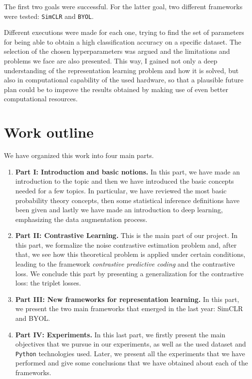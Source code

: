 The first two goals were successful. For the latter goal, two different frameworks were tested: \lstinline{SimCLR} and \lstinline{BYOL}. 

Different executions were made for each one, trying to find the set of parameters for being able to obtain a high classification accuracy on a specific dataset. The selection of the chosen hyperparameters was argued and the limitations and problems we face are also presented. This way, I gained not only a deep understanding of the representation learning problem and how it is solved, but also in computational capability of the used hardware, so that a plausible future plan could be to improve the results obtained by making use of even better computational resources.

\section*{Work outline}

We have organized this work into four main parts.

\begin{enumerate}
\item \textbf{Part I: Introduction and basic notions.} In this part, we have made an introduction to the topic and then we have introduced the basic concepts needed for a few topics. In particular, we have reviewed the most basic probability theory concepts, then some statistical inference definitions have been given and lastly we have made an introduction to deep learning, emphasizing the data augmentation process.
\item \textbf{Part II: Contrastive Learning.} This is the main part of our project. In this part, we formalize the noise contrastive estimation problem and, after that, we see how this theoretical problem is applied under certain conditions, leading to the framework \emph{contrastive predictive coding} and the contrastive loss. We conclude this part by presenting a generalization for the contrastive loss: the triplet losses.
\item \textbf{Part III: New frameworks for representation learning.} In this part, we present the two main frameworks that emerged in the last year: SimCLR and BYOL.

\item \textbf{Part IV: Experiments.} In this last part, we firstly present the main objectives that we pursue in our experiments, as well as the used dataset and \lstinline{Python} technologies used. Later, we present all the experiments that we have performed and give some conclusions that we have obtained about each of the frameworks.
\end{enumerate}
